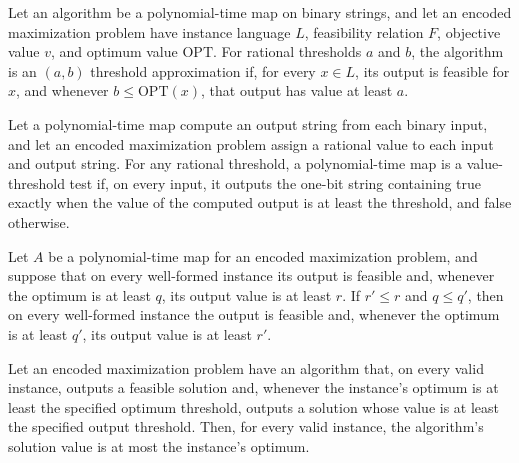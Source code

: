 \begin{definition}
\label{FABL.PolytimeMap.IsThresholdApproximation}
\leanok
{}
Let an algorithm be a polynomial-time map on binary strings, and let an encoded
maximization problem have instance language $L$, feasibility relation $F$, objective
value $v$, and optimum value $\mathrm{OPT}$. For rational thresholds $a$ and $b$, the
algorithm is an $(a,b)$ threshold approximation if, for every $x\in L$, its output is
feasible for $x$, and whenever $b\le \mathrm{OPT}(x)$, that output has value at least
$a$.
\end{definition}

\begin{definition}
\label{FABL.PolytimeMap.ValueThresholdTest}
\leanok
{}
Let a polynomial-time map compute an output string from each binary input, and let an
encoded maximization problem assign a rational value to each input and output string.
For any rational threshold, a polynomial-time map is a value-threshold test if, on every
input, it outputs the one-bit string containing true exactly when the value of the
computed output is at least the threshold, and false otherwise.
\end{definition}

\begin{theorem}
\label{FABL.PolytimeMap.IsThresholdApproximation.weaken}
\leanok
{}
Let $A$ be a polynomial-time map for an encoded maximization problem, and suppose that
on every well-formed instance its output is feasible and, whenever the optimum is at
least $q$, its output value is at least $r$. If $r'\le r$ and $q\le q'$, then on every
well-formed instance the output is feasible and, whenever the optimum is at least $q'$,
its output value is at least $r'$.
\end{theorem}

\begin{theorem}
\label{FABL.PolytimeMap.IsThresholdApproximation.value_le_optimum}
\leanok
{}
Let an encoded maximization problem have an algorithm that, on every valid instance,
outputs a feasible solution and, whenever the instance's optimum is at least the
specified optimum threshold, outputs a solution whose value is at least the specified
output threshold. Then, for every valid instance, the algorithm's solution value is at
most the instance's optimum.
\end{theorem}


